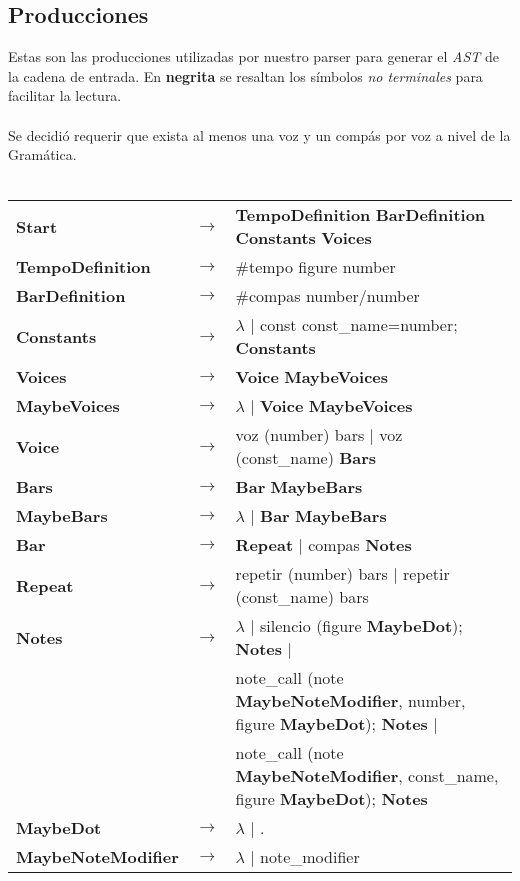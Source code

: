 \subsection{Producciones}
Estas son las producciones utilizadas por nuestro parser para generar el \textit{AST} de la cadena de entrada. En \textbf{negrita} se resaltan los símbolos \textit{no terminales} para facilitar la lectura. \\
\\
Se decidió requerir que exista al menos una voz y un compás por voz a nivel de la Gramática. \\
\\
\begin{tabular}{l l l}
	\textbf{Start} & $\rightarrow$ & \textbf{TempoDefinition} \textbf{BarDefinition} \textbf{Constants} \textbf{Voices} \\
	\textbf{TempoDefinition} & $\rightarrow$ & \#tempo figure number \\
	\textbf{BarDefinition} & $\rightarrow$ & \#compas number/number \\
	\textbf{Constants} & $\rightarrow$ & $\lambda$ $\vert$ const const\_name=number; \textbf{Constants} \\
	\textbf{Voices} & $\rightarrow$ & \textbf{Voice} \textbf{MaybeVoices} \\
	\textbf{MaybeVoices} & $\rightarrow$ & $\lambda$ $\vert$ \textbf{Voice} \textbf{MaybeVoices} \\
	\textbf{Voice} & $\rightarrow$ & voz (number) { bars } $\vert$ voz (const\_name) { \textbf{Bars} } \\
	\textbf{Bars} & $\rightarrow$ & \textbf{Bar} \textbf{MaybeBars} \\
	\textbf{MaybeBars} & $\rightarrow$ & $\lambda$ $\vert$ \textbf{Bar} \textbf{MaybeBars} \\
	\textbf{Bar} & $\rightarrow$ & \textbf{Repeat} $\vert$ compas { \textbf{Notes} } \\
	\textbf{Repeat} & $\rightarrow$ & repetir (number) { bars } $\vert$ repetir (const\_name) { bars } \\
	\textbf{Notes} & $\rightarrow$ & $\lambda$ $\vert$ silencio (figure \textbf{MaybeDot}); \textbf{Notes} $\vert$ \\
	& & note\_call (note \textbf{MaybeNoteModifier}, number, figure \textbf{MaybeDot}); \textbf{Notes} $\vert$ \\
	& & note\_call (note \textbf{MaybeNoteModifier}, const\_name, figure \textbf{MaybeDot}); \textbf{Notes} \\
	\textbf{MaybeDot} & $\rightarrow$ & $\lambda$ $\vert$ . \\
	\textbf{MaybeNoteModifier} & $\rightarrow$ & $\lambda$ $\vert$ note\_modifier \\
\end{tabular}

